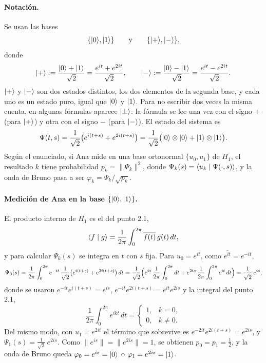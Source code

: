 \paragraph{Notación.} Se usan las bases
\[
  \{\lvert 0\rangle,\lvert 1\rangle\}\qquad\text{y}\qquad\{\lvert +\rangle,\lvert -\rangle\},
\]
donde
\[
  \lvert +\rangle:=\frac{\lvert 0\rangle+\lvert 1\rangle}{\sqrt2}=\frac{e^{it}+e^{2it}}{\sqrt2},\qquad
  \lvert -\rangle:=\frac{\lvert 0\rangle-\lvert 1\rangle}{\sqrt2}=\frac{e^{it}-e^{2it}}{\sqrt2}.
\]
$\lvert +\rangle$ y $\lvert -\rangle$ son dos estados distintos, los dos elementos de la segunda base, y cada uno es un estado puro, igual que $\lvert 0\rangle$ y $\lvert 1\rangle$. Para no escribir dos veces la misma cuenta, en algunas fórmulas aparece $\lvert \pm\rangle$: la fórmula se lee una vez con el signo $+$ (para $\lvert +\rangle$) y otra con el signo $-$ (para $\lvert -\rangle$).
El estado del sistema es
\[
  \Psi(t,s)=\frac1{\sqrt2}\bigl(e^{i(t+s)}+e^{2i(t+s)}\bigr)=\frac1{\sqrt2}\bigl(\lvert 0\rangle\otimes\lvert 0\rangle+\lvert 1\rangle\otimes\lvert 1\rangle\bigr).
\]
Según el enunciado, si Ana mide en una base ortonormal $\{u_0,u_1\}$ de $H_1$, el resultado $k$ tiene probabilidad $p_k=\|\Psi_k\|^2$, donde $\Psi_k(s)=\langle u_k\mid \Psi(\cdot,s)\rangle$, y la onda de Bruno pasa a ser $\varphi_k=\Psi_k/\sqrt{p_k}$.

\paragraph{Medición de Ana en la base $\{\lvert 0\rangle,\lvert 1\rangle\}$.} El producto interno de $H_1$ es el del punto 2.1,
\[
  \langle f\mid g\rangle=\frac1{2\pi}\int_0^{2\pi}\overline{f(t)}\,g(t)\,dt,
\]
y para calcular $\Psi_k(s)$ se integra en $t$ con $s$ fija. Para $u_0=e^{it}$, como $\overline{e^{it}}=e^{-it}$,
\[
  \Psi_0(s)=\frac1{2\pi}\int_0^{2\pi}e^{-it}\,\frac1{\sqrt2}\bigl(e^{i(t+s)}+e^{2i(t+s)}\bigr)\,dt
  =\frac1{\sqrt2}\Bigl(e^{is}\,\frac1{2\pi}\int_0^{2\pi}dt+e^{2is}\,\frac1{2\pi}\int_0^{2\pi}e^{it}\,dt\Bigr)
  =\frac1{\sqrt2}\,e^{is},
\]
donde se usaron $e^{-it}e^{i(t+s)}=e^{is}$, $e^{-it}e^{2i(t+s)}=e^{it}e^{2is}$ y la integral del punto 2.1,
\[
  \frac1{2\pi}\int_0^{2\pi}e^{ikt}\,dt=\begin{cases}1,&k=0,\\0,&k\neq0.\end{cases}
\]
Del mismo modo, con $u_1=e^{2it}$ el término que sobrevive es $e^{-2it}e^{2i(t+s)}=e^{2is}$, y $\Psi_1(s)=\frac1{\sqrt2}\,e^{2is}$. Como $\|e^{is}\|=\|e^{2is}\|=1$, se obtienen $p_0=p_1=\frac12$, y la onda de Bruno queda $\varphi_0=e^{is}=\lvert 0\rangle$ o $\varphi_1=e^{2is}=\lvert 1\rangle$.

